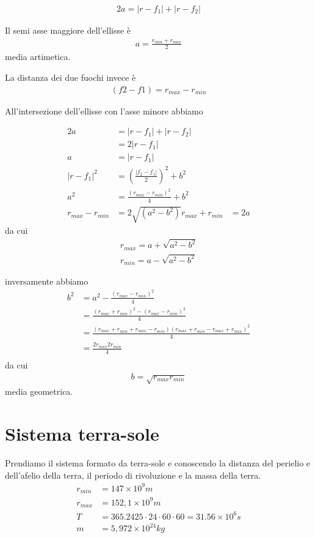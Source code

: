 \documentclass[a4paper,11pt]{article}
\begin{document}
\begin{align*}
	 2a = |r - f_1| + |r - f_2| 
\end{align*}

Il semi asse maggiore dell'ellisse è
\begin{align*}
	a = \frac{r_{min} + r_{max}}{2} 
\end{align*}
media artimetica.

La distanza dei due fuochi invece è
\begin{align*}
	(f2-f1) = r_{max} - r_{min}
\end{align*}

All'intersezione dell'ellisse con l'asse minore abbiamo

\begin{align*}
	2a & = |r - f_1| + |r - f_2| \\
	 & = 2 |r - f_1| \\
	a & = |r - f_1| \\
	|r - f_1|^2&  = (\frac{|f_2 - f_1|}{2})^2 + b^2 \\
	a^2&  = \frac{(r_{max} - r_{min})^2}{4} + b^2 \\
	r_{max} - r_{min} & = 2\sqrt{(a^2-b^2)}
	r_{max} + r_{min} & = 2a
\end{align*}
da cui
\begin{eqnarray}
	\label{rmax} r_{max} = a + \sqrt{a^2-b^2}\\
	\label{rmin} r_{min} = a - \sqrt{a^2-b^2}
\end{eqnarray}

inversamente abbiamo
\begin{align*}
	b^2 & = a^2 - \frac{(r_{max} - r_{min})^2}{4} \\
	 & = \frac{(r_{max} + r_{min})^2 - (r_{max} -r_{min})^2 }{4} \\
	 & = \frac{(r_{max} + r_{min} + r_{max} -r_{min}) (r_{max} + r_{min} - r_{max} +r_{min})^2 }{4} \\
	 & = \frac{2 r_{max} 2 r_{min} }{4} \\
\end{align*}
da cui
\begin{eqnarray}
\label{b1} b = \sqrt{r_{max} r_{min}}
\end{eqnarray}
media geometrica.

\section{Sistema terra-sole}

Prendiamo il sistema formato da terra-sole e conoscendo la distanza del perielio e dell'afelio della terra, il periodo di rivoluzione e la massa della terra.
\begin{align*}
	r_{min} & = 147 \times 10^9 m \\
	r_{max} & = 152,1 \times 10^9 m \\
	T & = 365.2425 \cdot 24 \cdot 60 \cdot 60 = 31.56 \times 10^6 s\\
	m & = 5,972 \times 10^{24} kg
\end{align*}
\end{document}
